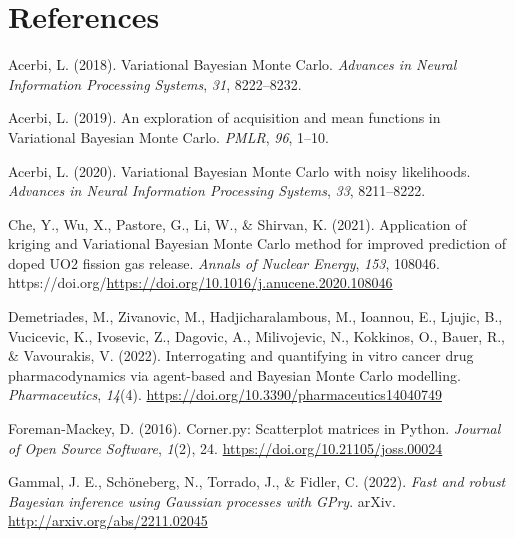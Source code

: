 \documentclass[
]{article}
\newlength{\cslhangindent}
\newlength{\cslentryspacingunit} %
\newenvironment{CSLReferences}[2] %
 {%
  \setlength{\parindent}{0pt}
  \ifodd #1
  \let\oldpar\par
  \def\par{\hangindent=\cslhangindent\oldpar}
  \fi
  \setlength{\parskip}{#2\cslentryspacingunit}
 }%
 {}
\begin{document}
\hypertarget{references}{%
\section*{References}\label{references}}

\hypertarget{refs}{}
\begin{CSLReferences}{1}{0}
\leavevmode{}%
Acerbi, L. (2018). {V}ariational {B}ayesian {M}onte {C}arlo.
\emph{Advances in Neural Information Processing Systems}, \emph{31},
8222--8232.

\leavevmode{}%
Acerbi, L. (2019). An exploration of acquisition and mean functions in
{V}ariational {B}ayesian {M}onte {C}arlo. \emph{PMLR}, \emph{96}, 1--10.

\leavevmode{}%
Acerbi, L. (2020). {V}ariational {B}ayesian {M}onte {C}arlo with noisy
likelihoods. \emph{Advances in Neural Information Processing Systems},
\emph{33}, 8211--8222.

\leavevmode{}%
Che, Y., Wu, X., Pastore, G., Li, W., \& Shirvan, K. (2021). Application
of kriging and {Variational Bayesian Monte Carlo} method for improved
prediction of doped UO2 fission gas release. \emph{Annals of Nuclear
Energy}, \emph{153}, 108046.
https://doi.org/\url{https://doi.org/10.1016/j.anucene.2020.108046}

\leavevmode{}%
Demetriades, M., Zivanovic, M., Hadjicharalambous, M., Ioannou, E.,
Ljujic, B., Vucicevic, K., Ivosevic, Z., Dagovic, A., Milivojevic, N.,
Kokkinos, O., Bauer, R., \& Vavourakis, V. (2022). Interrogating and
quantifying in vitro cancer drug pharmacodynamics via agent-based and
{Bayesian} {Monte Carlo} modelling. \emph{Pharmaceutics}, \emph{14}(4).
\url{https://doi.org/10.3390/pharmaceutics14040749}

\leavevmode{}%
Foreman-Mackey, D. (2016). Corner.py: Scatterplot matrices in {Python}.
\emph{Journal of Open Source Software}, \emph{1}(2), 24.
\url{https://doi.org/10.21105/joss.00024}

\leavevmode{}%
Gammal, J. E., Schöneberg, N., Torrado, J., \& Fidler, C. (2022).
\emph{Fast and robust {Bayesian} inference using {Gaussian} processes
with {GPry}}. arXiv. \url{http://arxiv.org/abs/2211.02045}


\end{CSLReferences}
\end{document}
